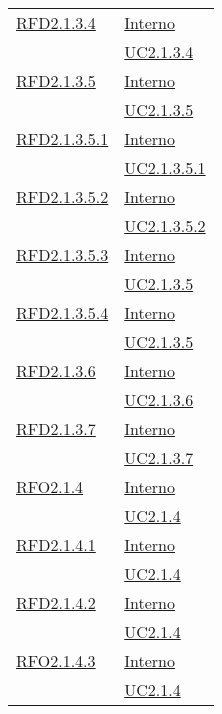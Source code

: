 \begin{longtable}{|>{\centering}m{5cm}|m{5cm}<{\centering}|}
\hyperlink{RFD2.1.3.4}{RFD2.1.3.4} & \hyperlink{Interno}{Interno}\\
& \hyperref[UC2.1.3.4]{UC2.1.3.4}\\ \hline

\hyperlink{RFD2.1.3.5}{RFD2.1.3.5} & \hyperlink{Interno}{Interno}\\
& \hyperref[UC2.1.3.5]{UC2.1.3.5}\\ \hline

\hyperlink{RFD2.1.3.5.1}{RFD2.1.3.5.1} & \hyperlink{Interno}{Interno}\\
& \hyperref[UC2.1.3.5.1]{UC2.1.3.5.1}\\ \hline

\hyperlink{RFD2.1.3.5.2}{RFD2.1.3.5.2} & \hyperlink{Interno}{Interno}\\
& \hyperref[UC2.1.3.5.2]{UC2.1.3.5.2}\\ \hline

\hyperlink{RFD2.1.3.5.3}{RFD2.1.3.5.3} & \hyperlink{Interno}{Interno}\\
& \hyperref[UC2.1.3.5]{UC2.1.3.5}\\ \hline

\hyperlink{RFD2.1.3.5.4}{RFD2.1.3.5.4} & \hyperlink{Interno}{Interno}\\
& \hyperref[UC2.1.3.5]{UC2.1.3.5}\\ \hline

\hyperlink{RFD2.1.3.6}{RFD2.1.3.6} & \hyperlink{Interno}{Interno}\\
& \hyperref[UC2.1.3.6]{UC2.1.3.6}\\ \hline

\hyperlink{RFD2.1.3.7}{RFD2.1.3.7} & \hyperlink{Interno}{Interno}\\
& \hyperref[UC2.1.3.7]{UC2.1.3.7}\\ \hline

\hyperlink{RFO2.1.4}{RFO2.1.4} & \hyperlink{Interno}{Interno}\\
& \hyperref[UC2.1.4]{UC2.1.4}\\ \hline

\hyperlink{RFD2.1.4.1}{RFD2.1.4.1} & \hyperlink{Interno}{Interno}\\
& \hyperref[UC2.1.4]{UC2.1.4}\\ \hline

\hyperlink{RFD2.1.4.2}{RFD2.1.4.2} & \hyperlink{Interno}{Interno}\\
& \hyperref[UC2.1.4]{UC2.1.4}\\ \hline

\hyperlink{RFO2.1.4.3}{RFO2.1.4.3} & \hyperlink{Interno}{Interno}\\
& \hyperref[UC2.1.4]{UC2.1.4}\\ \hline


\end{longtable}
